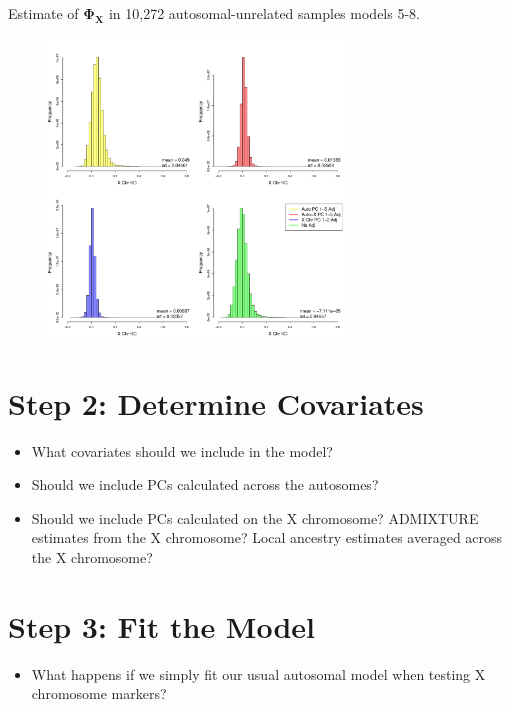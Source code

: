 \documentclass{beamer}
\begin{document}
\begin{frame}
\footnotesize Estimate of $\mathbf{\Phi_X}$ in 10,272 autosomal-unrelated samples models 5-8.
\centering
\begin{figure}
\includegraphics[height=8cm]{../hist_allXchrKC.pdf}
\end{figure}
\end{frame}


\section{Step 2: Determine Covariates}
\begin{frame}%
\begin{itemize}
\item What covariates should we include in the model?
\item Should we include PCs calculated across the autosomes?
\item Should we include PCs calculated on the X chromosome? ADMIXTURE estimates from the X chromosome?
Local ancestry estimates averaged across the X chromosome?
\end{itemize}
\end{frame}

\section{Step 3: Fit the Model}
\begin{frame}%
\begin{itemize}
\item What happens if we simply fit our usual autosomal model when testing X chromosome markers?
\end{itemize}
\end{frame}
\end{document}
